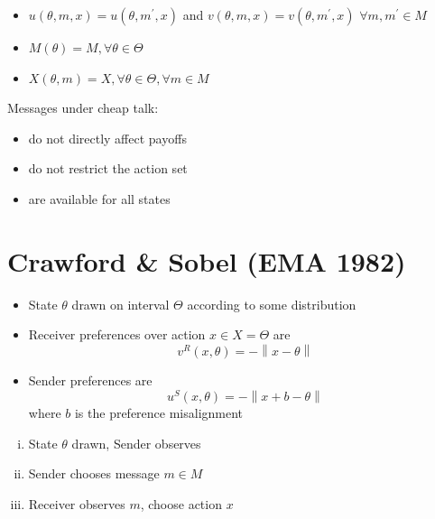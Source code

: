 \documentclass{beamer}
\begin{document}
\begin{frame}
	\begin{card}
			\begin{itemize}
				\item $u(\theta,m,x)=u(\theta,m^\prime,x)$ and $v(\theta,m,x)=v(\theta,m^\prime,x)$
				$\forall m,m^\prime\in M$ 
				\item $M(\theta)=M,\forall\theta\in\Theta$
				\item $X(\theta,m)=X,\forall\theta\in\Theta,\forall m\in M$
			\end{itemize}
\end{card}
			\pause
\begin{card}
Messages under cheap talk:
			\begin{itemize}
				\item do not directly affect payoffs
				\item do not restrict the action set
				\item are available for all states
			\end{itemize}
\end{card}
\end{frame}

\section{Crawford \& Sobel (EMA 1982)}

\begin{frame}
\begin{card}
	\begin{itemize}
		\item State $\theta$ drawn on interval $\Theta$ according to some distribution
		\item Receiver preferences over action $x\in X=\Theta$ are $$v^R(x,\theta)=-\left\|x-\theta \right\|$$
		\item Sender preferences are $$u^S(x,\theta)=-\left\|x+b-\theta \right\|$$
		where $b$ is the preference misalignment
	\end{itemize}
\end{card}
\end{frame}

\begin{frame}
\begin{card}
		\begin{enumerate}[i)]
		\item State $\theta$ drawn, Sender observes
		\item Sender chooses message $m\in M$
		\item Receiver observes $m$, choose action $x$
		\end{enumerate}
\end{card}
\end{frame}
\end{document}
